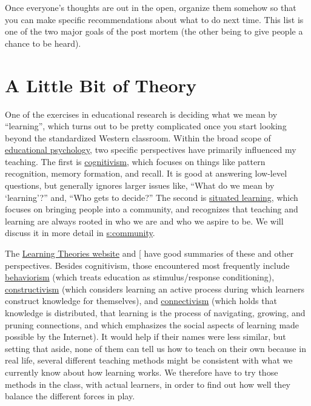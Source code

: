 Once everyone's thoughts are out in the open, organize them somehow so
that you can make specific recommendations about what to do next time.
This list is one of the two major goals of the post mortem (the other
being to give people a chance to be heard).

\chapter{A Little Bit of Theory}\label{s:theory}

One of the exercises in educational research is deciding what we mean
by ``learning'', which turns out to be pretty complicated once you start
looking beyond the standardized Western classroom. Within the broad
scope of \protect\hyperlink{g:educational-psychology}{educational psychology}, two
specific perspectives have primarily influenced my teaching. The first
is \protect\hyperlink{g:cognitivism}{cognitivism}, which focuses on things like pattern
recognition, memory formation, and recall. It is good at answering
low-level questions, but generally ignores larger issues like, ``What
do we mean by `learning'?'' and, ``Who gets to decide?'' The second is
\protect\hyperlink{g:situated-learning}{situated learning}, which focuses on bringing
people into a community, and recognizes that teaching and learning are
always rooted in who we are and who we aspire to be. We will discuss
it in more detail in \protect\hyperlink{CHAPTER}{s:community}.

The \href{http://www.learning-theories.com/}{Learning Theories website} and
{[}\protect[\hyperlink{b:Wibu2016}{Wibu2016}]{]} have good summaries of these and other
perspectives. Besides cognitivism, those encountered most frequently
include \protect\hyperlink{g:behaviorism}{behaviorism} (which treats education as
stimulus/response conditioning), \protect\hyperlink{g:constructivism}{constructivism}
(which considers learning an active process during which learners
construct knowledge for themselves), and
\protect\hyperlink{g:connectivism}{connectivism} (which holds that knowledge is
distributed, that learning is the process of navigating, growing, and
pruning connections, and which emphasizes the social aspects of
learning made possible by the Internet). It would help if their names
were less similar, but setting that aside, none of them can tell us
how to teach on their own because in real life, several different
teaching methods might be consistent with what we currently know about
how learning works. We therefore have to try those methods in the
class, with actual learners, in order to find out how well they
balance the different forces in play.

